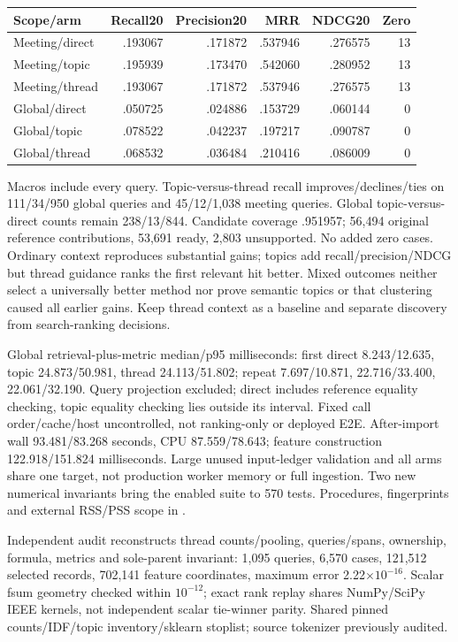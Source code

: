 \documentclass[11pt]{article}
\begin{document}
\begin{center}
\begin{tabular}{lrrrrr}
Scope/arm & Recall20 & Precision20 & MRR & NDCG20 & Zero\\
\hline
Meeting/direct & .193067 & .171872 & .537946 & .276575 & 13\\
Meeting/topic & .195939 & .173470 & .542060 & .280952 & 13\\
Meeting/thread & .193067 & .171872 & .537946 & .276575 & 13\\
Global/direct & .050725 & .024886 & .153729 & .060144 & 0\\
Global/topic & .078522 & .042237 & .197217 & .090787 & 0\\
Global/thread & .068532 & .036484 & .210416 & .086009 & 0\\
\end{tabular}
\end{center}
Macros include every query. Topic-versus-thread recall improves/declines/ties
on 111/34/950 global queries and 45/12/1,038 meeting queries. Global
topic-versus-direct counts remain 238/13/844. Candidate coverage .951957;
56,494 original reference contributions, 53,691 ready, 2,803 unsupported.
No added zero cases. Ordinary context reproduces substantial gains; topics
add recall/precision/NDCG but thread guidance ranks the first relevant hit
better. Mixed outcomes neither select a universally better method nor prove
semantic topics or that clustering caused all earlier gains. Keep thread
context as a baseline and separate discovery from search-ranking decisions.

Global retrieval-plus-metric median/p95 milliseconds: first direct
8.243/12.635, topic 24.873/50.981, thread 24.113/51.802; repeat
7.697/10.871, 22.716/33.400, 22.061/32.190. Query projection excluded;
direct includes reference equality checking, topic equality checking lies
outside its interval. Fixed call order/cache/host uncontrolled, not ranking-only
or deployed E2E. After-import wall 93.481/83.268 seconds, CPU 87.559/78.643;
feature construction 122.918/151.824 milliseconds. Large unused input-ledger
validation and all arms share one target, not production worker memory or full
ingestion. Two new numerical invariants bring the enabled suite to 570 tests.
Procedures, fingerprints and external RSS/PSS scope in
.

Independent audit reconstructs thread counts/pooling, queries/spans, ownership,
formula, metrics and sole-parent invariant: 1,095 queries, 6,570 cases,
121,512 selected records, 702,141 feature coordinates, maximum error
2.22$\times10^{-16}$. Scalar fsum geometry checked within $10^{-12}$;
exact rank replay shares NumPy/SciPy IEEE kernels, not independent scalar
tie-winner parity. Shared pinned counts/IDF/topic inventory/sklearn stoplist;
source tokenizer previously audited.
\end{document}
